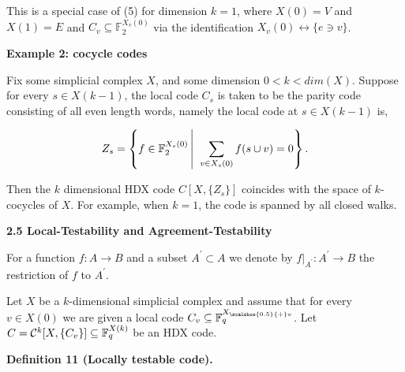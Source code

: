 This is a special case of (5) for dimension $k=1$, where $X(0)=V$ and $X(1)=E$ and $C_{v}\subseteq\mathbb{F}_{2}^{X_{v}(0)}$ via the identification $X_{v}(0)\leftrightarrow\{e\ni v\}$.\par





\par\medskip\noindent\textbf{Example 2: cocycle codes}\par




Fix some simplicial complex $X$, and some dimension $0<k<dim(X)$. Suppose for every $s\in X(k-1)$, the local code $C_{s}$ is taken to be the parity code consisting of all even length words, namely the local code at $s\in X(k-1)$ is,\par


\[\begin{gathered}
Z_{s}=\left\{f\in\mathbb{F}_{2}^{X_{s}(0)}\left|\;\vphantom{f\in\mathbb{F}_{2}^{X_{s}(0)}\sum_{v\in X_{s}(0)}f(s\cup v)=0}\right.\sum_{v\in X_{s}(0)}f(s\cup
v)=0\right\}.
\end{gathered}\]


Then the $k$ dimensional HDX code $C[X,\{Z_{s}\}]$ coincides with the space of $k$-cocycles of $X$. For example, when $k=1$, the code is spanned by all closed walks.\par






\par\medskip\noindent\textbf{
2.5 Local-Testability and Agreement-Testability}\par




For a function $f:A\to B$ and a subset $A^{\prime}\subset A$ we denote by $f|_{A^{\prime}}:A^{\prime}\to B$ the restriction of $f$ to $A^{\prime}$.\par




Let $X$ be a $k$-dimensional simplicial complex and assume that for every $v\in X(0)$ we are given a local code $C_{v}\subseteq\mathbb{F}_{q}^{{X}_{\scalebox{0.5}{+}v}}$. Let $C={\cal C}^{k}[X,\{C_{v}\}]\subseteq\mathbb{F}_{q}^{X(k)}$ be an HDX code.\par





\par\medskip\noindent\textbf{
\textbf{Definition 11}\textbf{ }(Locally testable code)\textbf{.}
}\par



